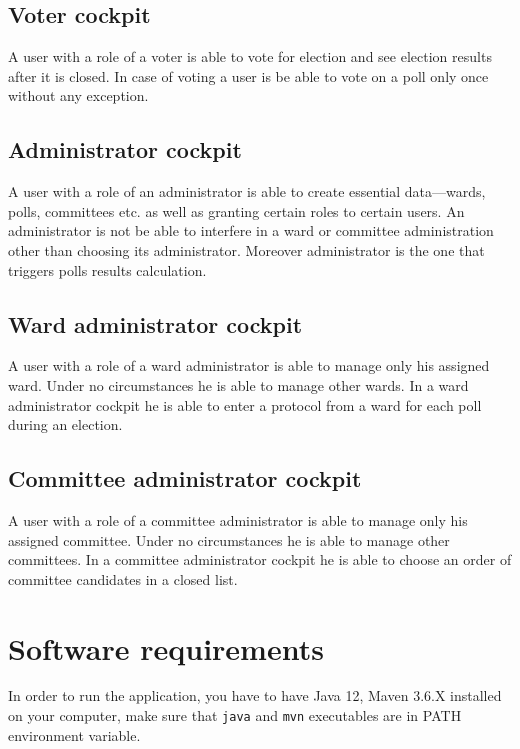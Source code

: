 \documentclass[a4paper,twoside,12pt]{book}
\begin{document}
    \subsection{Voter cockpit}
    A user with a role of a voter is able to vote for election and see election results after it is closed.
    In case of voting a user is be able to vote on a poll only once without any exception.

    \subsection{Administrator cockpit}
    A user with a role of an administrator is able to create essential data---wards, polls, committees etc. as well as granting certain roles to certain users.
    An administrator is not be able to interfere in a ward or committee administration other than choosing its administrator.
    Moreover administrator is the one that triggers polls results calculation.

    \subsection{Ward administrator cockpit}
    A user with a role of a ward administrator is able to manage only his assigned ward. Under no circumstances he is able to manage other wards.
    In a ward administrator cockpit he is able to enter a  protocol from a ward for each poll during an election.

    \subsection{Committee administrator cockpit}
    A user with a role of a committee administrator is able to manage only his assigned committee. Under no circumstances he is able to manage other committees.
    In a committee administrator cockpit he is able to choose an order of committee candidates in a closed list. 
  
  \section{Software requirements}
    In order to run the application, you have to have Java 12, Maven 3.6.X installed on your computer, 
    make sure that \lstinline[language=bash]|java| and \lstinline[language=bash]|mvn| executables are in PATH environment variable.
\end{document}
